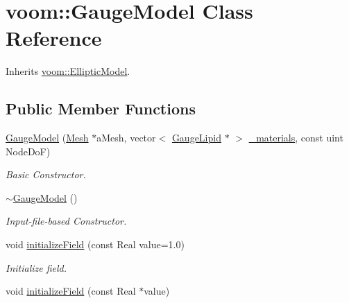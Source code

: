 \hypertarget{classvoom_1_1_gauge_model}{
\section{voom::GaugeModel Class Reference}
\label{classvoom_1_1_gauge_model}
}


Inherits \hyperlink{classvoom_1_1_elliptic_model}{voom::EllipticModel}.\subsection*{Public Member Functions}
\begin{DoxyCompactItemize}
\item 
\hyperlink{classvoom_1_1_gauge_model_a3396f08fc7d07e6a0bec056a30cc955d}{GaugeModel} (\hyperlink{classvoom_1_1_mesh}{Mesh} $\ast$aMesh, vector$<$ \hyperlink{classvoom_1_1_gauge_lipid}{GaugeLipid} $\ast$ $>$ \hyperlink{classvoom_1_1_gauge_model_a68fb6771675d320ae7e850b09fb487e4}{\_\-materials}, const uint NodeDoF)
\begin{DoxyCompactList}\small\item\em Basic Constructor. \item\end{DoxyCompactList}\item 
\hyperlink{classvoom_1_1_gauge_model_ad12784e32ca359d0e12d472c7c4513ee}{$\sim$GaugeModel} ()
\begin{DoxyCompactList}\small\item\em Input-\/file-\/based Constructor. \item\end{DoxyCompactList}\item 
\hypertarget{classvoom_1_1_gauge_model_ace2ffdc65841a4111185be468c252cc2}{
void \hyperlink{classvoom_1_1_gauge_model_ace2ffdc65841a4111185be468c252cc2}{initializeField} (const Real value=1.0)}
\label{classvoom_1_1_gauge_model_ace2ffdc65841a4111185be468c252cc2}

\begin{DoxyCompactList}\small\item\em Initialize field. \item\end{DoxyCompactList}\item 
\hypertarget{classvoom_1_1_gauge_model_ad6b74547887af1de4bd7bcca0c6f1cc6}{
void \hyperlink{classvoom_1_1_gauge_model_ad6b74547887af1de4bd7bcca0c6f1cc6}{initializeField} (const Real $\ast$value)}
\label{classvoom_1_1_gauge_model_ad6b74547887af1de4bd7bcca0c6f1cc6}


\end{DoxyCompactItemize}
